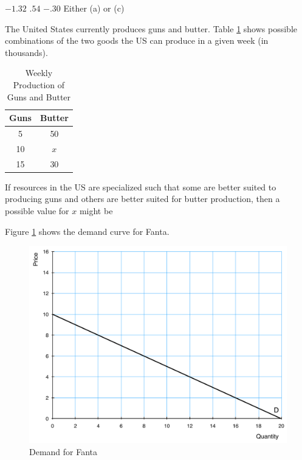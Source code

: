 \documentclass[addpoints,11pt]{exam}
\theoremstyle{definition}
\begin{document}
\begin{questions}
	\begin{choices}
		\choice $-1.32$
		\CorrectChoice $.54$
		\choice $-.30$
		\choice Either (a) or (c)
	\end{choices}

	
	\question The United States currently produces guns and butter. Table \ref{MC22} shows possible combinations of the two goods the US can produce in a given week (in thousands). 
	
	\begin{table}[h!]
		\caption{Weekly Production of Guns and Butter}
		\centering
		\begin{tabular}{  c| c} 
			
			Guns & Butter \\
			\hline
			5 & 50 \\
			10 & $x$  \\
			15 & 30 \\
		\end{tabular}
		\label{MC22}
	\end{table}
	
	If resources in the US are specialized such that some are better suited to producing guns and others are better suited for butter production, then a possible value for $x$ might be
		
		\begin{choices}
				\choice 30
				\choice 35
				\choice 40
				\CorrectChoice 45
		\end{choices}
		
	
	
	\question Figure \ref{MC23} shows the demand curve for Fanta.
	
	\begin{figure}[H]
		\centering
		\includegraphics[scale=.40]{Exam1_MC22.pdf}
		\caption{Demand for Fanta}
		\label{MC23}
	\end{figure}
	

\end{questions}
\end{document}
